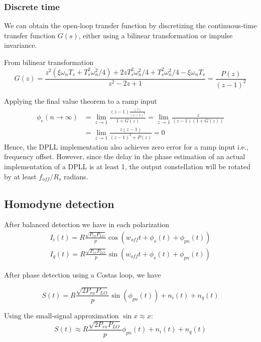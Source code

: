 \documentclass[a4paper]{article}
\begin{document}
\subsubsection{Discrete time}

We can obtain the open-loop transfer function by discretizing the continuous-time transfer function $G(s)$, either using a bilinear transformation or impulse invariance.

From bilinear transformation
\begin{equation}
	G(z) = \frac{z^2(\xi\omega_nT_s + T_s^2\omega_n^2/4) + 2zT_s^2\omega_n^2/4 + T_s^2\omega_n^2/4 - \xi\omega_nT_s}{z^2 - 2z + 1} = \frac{P(z)}{(z-1)^2}
\end{equation}

Applying the final value theorem to a ramp input
\begin{align} \nonumber
	\phi_e(n\to\infty) &= \lim_{z\to 1} \frac{(z-1)\frac{(z)}{(z-1)^2}}{1 + G(z)} = \lim_{z\to 1} \frac{z}{(z-1)(1 + G(z))} \\
	&= \lim_{z\to 1} \frac{z(z-1)}{(z-1)^2 + P(z)} = 0
\end{align}
Hence, the DPLL implementation also achieves zero error for a ramp input i.e., frequency offset. However, since the delay in the phase estimation of an actual implementation of a DPLL is at least 1, the output constellation will be rotated by at least $f_{off}/R_s$ radians.

\subsection{Homodyne detection}
After balanced detection we have in each polarization
\begin{align}
I_i(t) = R\frac{\sqrt{P_{rx}P_{LO}}}{p}\cos(w_{off}t + \phi_s(t) + \phi_{pn}(t)) \\
I_q(t) =  R\frac{\sqrt{P_{rx}P_{LO}}}{p}\sin(w_{off}t + \phi_s(t) + \phi_{pn}(t))
\end{align}

After phase detection using a Costas loop, we have

\begin{equation}
S(t) = R\frac{\sqrt{2P_{rx}P_{LO}}}{p}\sin(\phi_{pn}(t)) + n_i(t) + n_q(t)
\end{equation}

Using the small-signal approximation $\sin x \approx x$:
\begin{equation}
S(t) \approx R\frac{\sqrt{2P_{rx}P_{LO}}}{p}\phi_{pn}(t) + n_i(t) + n_q(t)
\end{equation}
\end{document}
